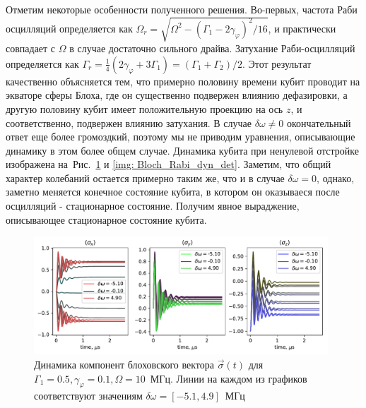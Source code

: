 Отметим некоторые особенности полученного решения. Во-первых, частота Раби осцилляций определяется как $\Omega_r = \sqrt{\Omega^2-(\Gamma_1-2\gamma_\varphi)^2/16}$, и практически совпадает с $\Omega$ в случае достаточно сильного драйва. Затухание Раби-осцилляций определяется как $\Gamma_r = \frac{1}{4}\left(2 \gamma _{\varphi }+3 \Gamma _1\right) = \left(\Gamma_1 + \Gamma_2\right)/2$. Этот результат качественно объясняется тем, что примерно половину времени кубит проводит на экваторе сферы Блоха, где он существенно подвержен влиянию дефазировки, а другую половину кубит имеет положительную проекцию на ось $z$, и соответственно, подвержен влиянию затухания.
В случае $\delta\omega \ne 0$ окончательный ответ еще более громоздкий, поэтому мы не приводим уравнения, описывающие динамику в этом более общем случае. Динамика кубита при ненулевой отстройке изображена на~Рис.~\ref{img: Rabi_dyn_det} и \ref{img: Bloch_Rabi_dyn_det}. Заметим, что общий характер колебаний остается примерно таким же, что и в случае $\delta\omega=0$, однако, заметно меняется конечное состояние кубита, в котором он оказываеся после осцилляций - стационарное состояние. Получим явное выраджение, описывающее стационарное состояние кубита.
\begin{figure}[t]
	\includegraphics[width=0.98\textwidth]{images/Rabi_det_2.pdf}
	\caption[Динамика состояния кубита под действием внешнего поля: случай ненулевой отстройки]{Динамика компонент блоховского вектора $\vec{\sigma}(t)$ для $\Gamma_1=0.5, \gamma_\varphi=0.1, \Omega = 10$~МГц. Линии на каждом из графиков соответствуют значениям $\delta\omega=[-5.1,4.9]$~МГц }
	\label{img: Rabi_dyn_det}
\end{figure}
